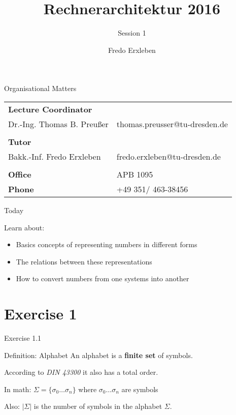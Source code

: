 \documentclass[11pt]{tudbeamer}
\title{Rechnerarchitektur 2016}
\subtitle{Session 1}
\author{Fredo Erxleben}
\begin{document}
  \maketitle

\begin{frame}{Organisational Matters}

	\begin{tabular}{ll}
		\textbf{Lecture Coordinator}	&\\
		Dr.-Ing. Thomas B. Preußer	& thomas.preusser@tu-dresden.de\\
		\\
		\textbf{Tutor}				&\\
		Bakk.-Inf. Fredo Erxleben	& fredo.erxleben@tu-dresden.de\\
		\\
		\textbf{Office}				& APB 1095\\
		\textbf{Phone}				& +49 351/ 463-38456\\
	\end{tabular}

\end{frame}

\begin{frame}{Today}

	Learn about:
	\begin{itemize}
		\item Basics concepts of representing numbers in different forms
		\item The relations between these representations
		\item How to convert numbers from one systems into another 
	\end{itemize}

\end{frame}

\section{Exercise 1}

\begin{frame}{Exercise 1.1}

	\begin{block}{Definition: Alphabet}
		An alphabet is a \textbf{finite set} of symbols.
	\end{block}
	
	According to \textit{DIN 43300} it also has a total order.
	
	\begin{block}{In math:}
		$\Sigma = \lbrace \sigma_0 \dots \sigma_n \rbrace$
		where $\sigma_0 \dots \sigma_n$ are symbols
	\end{block}
	
	Also: $|\Sigma|$ is the number of symbols in the alphabet $\Sigma$.

\end{frame}
\end{document}
